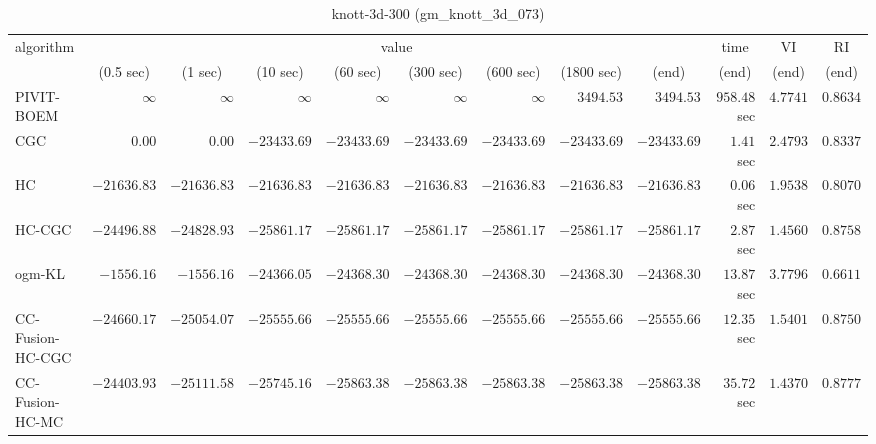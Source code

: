 \begin{table}[H]
\scriptsize
\centering
\caption{knott-3d-300 (gm\_knott\_3d\_073)}
\label{tab:anytimetable-knott-3d-300-gm-knott-3d-073}
\begin{tabular}{lrrrrrrrrrrr}
\toprule
           algorithm &                                   \multicolumn{8}{c}{value} & \multicolumn{1}{c}{time}    & \multicolumn{1}{c}{VI}  & \multicolumn{1}{c}{RI} \\  
\cmidrule(lr){2-9}\cmidrule(lr){10-10} \cmidrule(lr){11-11} \cmidrule(lr){12-12}   
                     & \multicolumn{1}{c}{(0.5 sec)} & \multicolumn{1}{c}{(1 sec)} & \multicolumn{1}{c}{(10 sec)} & \multicolumn{1}{c}{(60 sec)} & \multicolumn{1}{c}{(300 sec)} & \multicolumn{1}{c}{(600 sec)} & \multicolumn{1}{c}{(1800 sec)} & \multicolumn{1}{c}{(end)} & \multicolumn{1}{c}{(end)}    & \multicolumn{1}{c}{(end)}   & \multicolumn{1}{c}{(end)}  \\ \midrule 
          PIVIT-BOEM & $\infty$ & $\infty$ & $\infty$ & $\infty$ & $\infty$ & $\infty$ & $      3494.53$ & $      3494.53$ & $       958.48$ sec    & $       4.7741$  & $       0.8634$ \\ 
                 CGC & $         0.00$ & $         0.00$ & $    -23433.69$ & $    -23433.69$ & $    -23433.69$ & $    -23433.69$ & $    -23433.69$ & $    -23433.69$ & $         1.41$ sec    & $       2.4793$  & $       0.8337$ \\ 
                  HC & $    -21636.83$ & $    -21636.83$ & $    -21636.83$ & $    -21636.83$ & $    -21636.83$ & $    -21636.83$ & $    -21636.83$ & $    -21636.83$ & $         0.06$ sec    & $       1.9538$  & $       0.8070$ \\ 
              HC-CGC & $    -24496.88$ & $    -24828.93$ & $    -25861.17$ & $    -25861.17$ & $    -25861.17$ & $    -25861.17$ & $    -25861.17$ & $    -25861.17$ & $         2.87$ sec    & $       1.4560$  & $       0.8758$ \\ 
              ogm-KL & $     -1556.16$ & $     -1556.16$ & $    -24366.05$ & $    -24368.30$ & $    -24368.30$ & $    -24368.30$ & $    -24368.30$ & $    -24368.30$ & $        13.87$ sec    & $       3.7796$  & $       0.6611$ \\ 
    CC-Fusion-HC-CGC & $    -24660.17$ & $    -25054.07$ & $    -25555.66$ & $    -25555.66$ & $    -25555.66$ & $    -25555.66$ & $    -25555.66$ & $    -25555.66$ & $        12.35$ sec    & $       1.5401$  & $       0.8750$ \\ 
     CC-Fusion-HC-MC & $    -24403.93$ & $    -25111.58$ & $    -25745.16$ & $    -25863.38$ & $    -25863.38$ & $    -25863.38$ & $    -25863.38$ & $    -25863.38$ & $        35.72$ sec    & $       1.4370$  & $       0.8777$ \\ 

\end{tabular}
\end{table}
